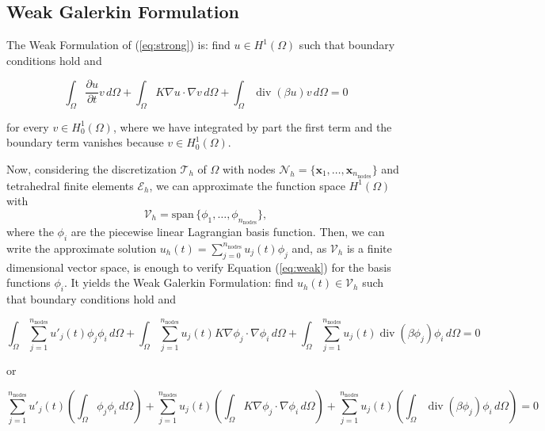 \documentclass[hidelinks]{article}
\DeclareMathOperator{\divg}{div}
\begin{document}
\subsection{Weak Galerkin Formulation}
The Weak Formulation of (\ref{eq:strong}) is: find $u \in H^1(\Omega)$ such that boundary conditions hold and 

\begin{equation}\tag{$W$}\label{eq:weak}
\int_\Omega \frac{\partial u}{\partial t } v \,d\Omega + \int_\Omega K \nabla u \cdot \nabla v \,d\Omega + \int_\Omega \divg( \beta u) v\,d\Omega = 0
\end{equation}

for every $v \in H^1_0(\Omega)$, where we have integrated by part the first term and the boundary term vanishes because $v \in H^1_0(\Omega)$.

Now, considering the discretization $\mathcal{T}_h$ of $\Omega$ with nodes $\mathcal{N}_h = \{\mathbf{x}_1, \dots, \mathbf{x}_{n_\text{nodes}}\}$ and tetrahedral finite elements $\mathcal{E}_h$, we can approximate the function space $H^1(\Omega)$ with 
\[
\mathcal{V}_h = \text{span}\, \{\phi_1, \dots, \phi_{n_\text{nodes}} \}, 
\]
where the $\phi_i$ are the piecewise linear Lagrangian basis function. Then, we can write the approximate solution $u_h(t) = \sum_{j=0}^{n_\text{nodes}} u_j(t) \phi_j$ and, as $\mathcal{V}_h$ is a finite dimensional vector space, is enough to verify Equation (\ref{eq:weak}) for the basis functions $\phi_i$. It yields the Weak Galerkin Formulation: find $u_h(t) \in \mathcal{V}_h$ such that boundary conditions hold and

\begin{equation}\tag{$W_h$}\label{eq:weakGalerkin1}
\int_\Omega \sum_{j=1}^{n_\text{nodes}} u'_j(t)\phi_j\phi_i \,d\Omega +\int_\Omega \sum_{j=1}^{n_\text{nodes}} u_j(t) K \nabla \phi_j \cdot \nabla \phi_i \,d\Omega + \int_\Omega \sum_{j=1}^{n_\text{nodes}} u_j(t) \divg( \beta \phi_j) \phi_i\,d\Omega = 0
\end{equation}

or 

\begin{equation}\tag{$W_h$}\label{eq:weakGalerkin2}
\sum_{j=1}^{n_\text{nodes}} u'_j(t) \left( \int_\Omega \phi_j\phi_i \,d\Omega \right) + \sum_{j=1}^{n_\text{nodes}} u_j(t) \left(\int_\Omega K  \nabla \phi_j \cdot \nabla \phi_i \,d\Omega\right) + \sum_{j=1}^{n_\text{nodes}} u_j(t) \left(\int_\Omega  \divg( \beta \phi_j) \phi_i\,d\Omega\right) = 0
\end{equation}
\end{document}
